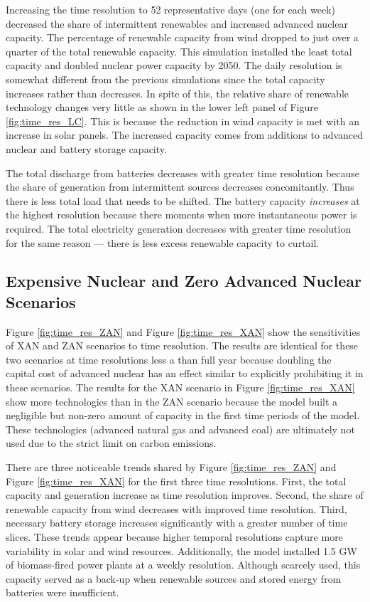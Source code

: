 Increasing the time resolution to 52 representative days (one for
each week) decreased the share of intermittent renewables and increased advanced
nuclear capacity. The percentage of renewable capacity from wind dropped to
just over a quarter of the total renewable capacity. This simulation installed
the least total capacity and doubled nuclear power capacity by 2050.
The daily resolution is somewhat different from the previous simulations
since the total capacity increases rather than decreases.
In spite of this, the relative share of renewable technology changes very little
as shown in the lower left panel of Figure \ref{fig:time_res_LC}.
This is because the reduction in wind capacity is met with an increase in solar
panels. The increased capacity comes from additions to advanced nuclear and battery
storage capacity.

The total discharge from batteries decreases with greater time resolution because
the share of generation from intermittent sources decreases concomitantly. Thus
there is less total load that needs to be shifted. The battery capacity \textit{increases}
at the highest resolution because there moments when more instantaneous power is
required. The total electricity generation decreases with greater time resolution
for the same reason --- there is less excess renewable capacity to curtail.

\subsection{Expensive Nuclear and Zero Advanced Nuclear Scenarios}
\label{section:zan_xan}

Figure \ref{fig:time_res_ZAN} and Figure \ref{fig:time_res_XAN} show the sensitivities of
\gls{XAN} and \gls{ZAN} scenarios to time resolution.
The results are identical for these two scenarios at time resolutions less a than
full year because doubling the capital cost of advanced nuclear has an effect similar
to explicitly prohibiting it in these scenarios. The results for the \gls{XAN}
scenario in Figure \ref{fig:time_res_XAN} show more technologies than in the
\gls{ZAN} scenario because the model built a negligible but non-zero amount of
capacity in the first time periods of the model. These technologies (advanced natural
gas and advanced coal) are ultimately not used due to the strict limit on carbon
emissions.

There are three noticeable trends shared by Figure \ref{fig:time_res_ZAN} and Figure
\ref{fig:time_res_XAN} for the first three time resolutions.
 First, the total capacity and generation increase as time resolution improves.
Second, the share of renewable capacity from wind decreases with improved time resolution.
Third, necessary battery storage increases significantly with a greater number of time
slices. These trends appear because higher temporal resolutions capture more
variability in solar and wind resources. Additionally, the model installed 1.5 GW
of biomass-fired power plants at a weekly resolution. Although scarcely used,
this capacity served as a back-up when renewable sources and stored energy from
batteries were insufficient.

